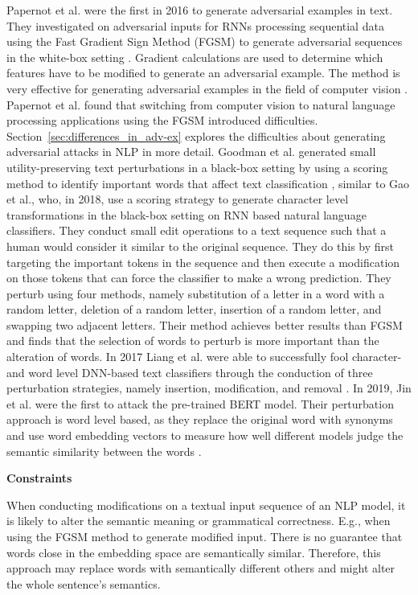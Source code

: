     Papernot et al. were the first in 2016 to generate adversarial examples in text. They investigated on adversarial inputs for RNNs processing sequential data using the Fast Gradient Sign Method (FGSM) to generate adversarial sequences in the white-box setting \cite{papernot2016crafting}. 
    Gradient calculations are used to determine which features have to be modified to generate an adversarial example. The method is very effective for generating adversarial examples in the field of computer vision \cite{goodfellow2014explaining}.
    Papernot et al. found that switching from computer vision to natural language processing applications using the FGSM introduced difficulties. Section~\ref{sec:differences_in_adv-ex} explores the difficulties about generating adversarial attacks in NLP in more detail. 
    Goodman et al. generated small utility-preserving text perturbations in a black-box setting by using a scoring method to identify important words that affect text classification \cite{goodman2020fastwordbug}, similar to Gao et al., who, in 2018, use a scoring strategy to generate character level transformations in the black-box setting on RNN based natural language classifiers. They conduct small edit operations to a text sequence such that a human would consider it similar to the original sequence. They do this by first targeting the important tokens in the sequence and then execute a modification on those tokens that can force the classifier to make a wrong prediction. They perturb using four methods, namely substitution of a letter in a word with a random letter, deletion of a random letter, insertion of a random letter, and swapping two adjacent letters. Their method achieves better results than FGSM  and finds that the selection of words to perturb is more important than the alteration of words\cite{gao2018black}.  In 2017 Liang et al. were able to successfully fool character- and word level DNN-based text classifiers through the conduction of three perturbation strategies, namely insertion, modification, and removal \cite{liang2017deep}. In 2019, Jin et al. were the first to attack the pre-trained BERT model. Their perturbation approach is word level based, as they replace the original word with synonyms and use word embedding vectors to measure how well different models judge the semantic similarity between the words \cite{jin2019bert}.
    
    
\textbf{Constraints}
\label{sec:constraints}

    When conducting modifications on a textual input sequence of an NLP model, it is likely to alter the semantic meaning or grammatical correctness. E.g., when using the FGSM method to generate modified input. There is no guarantee that words close in the embedding space are semantically similar. Therefore, this approach may replace words with semantically different others and might alter the whole sentence's semantics.
    
